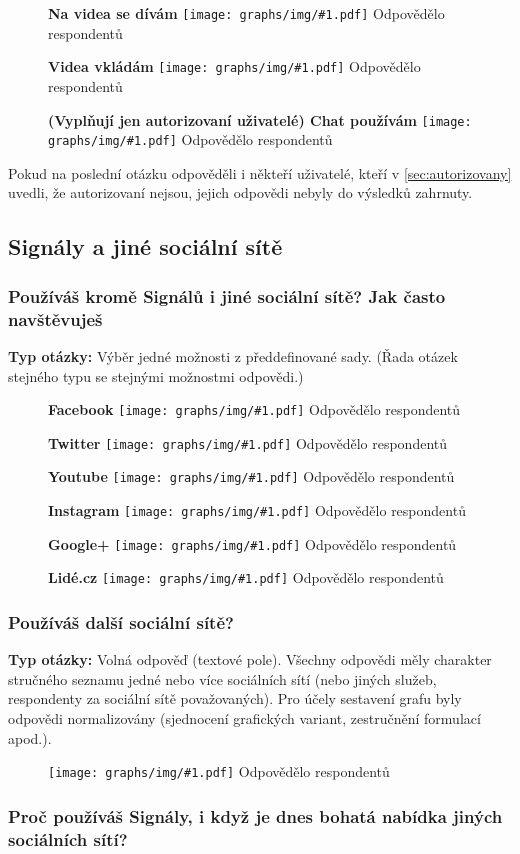\documentclass[12pt, a4paper, twoside]{article}
\newcommand{\answercount}[1]{Odpovědělo  respondentů}
\newcommand{\includegraph}[2]{
  \begin{figure}[H]
    \centering
    \textbf{#2}
    \texttt{[image: graphs/img/\#1.pdf]}
    \answercount{#1}
  \end{figure}
}
\newcommand{\qtype}{\textbf{Typ otázky:}
}
\newcommand{\pickOne}{Výběr jedné možnosti z předdefinované sady\xspace}
\newcommand{\series}{(Řada otázek stejného typu se stejnými možnostmi odpovědi.)\xspace}
\newcommand{\freeEntry}{Volná odpověď (textové pole)}
\begin{document}
\includegraph{funkcionality_videa_prohlizim}{Na videa se dívám}

\includegraph{funkcionality_videa_vkladam}{Videa vkládám}

\includegraph{funkcionality_autorizovani_chat}{(Vyplňují jen autorizovaní uživatelé) Chat používám}

Pokud na poslední otázku odpověděli i někteří uživatelé,
kteří v \ref{sec:autorizovany} uvedli, že autorizovaní nejsou,
jejich odpovědi nebyly do výsledků zahrnuty.

\subsection{Signály a jiné sociální sítě}\label{sec:jinesite}

\subsubsection{Používáš kromě Signálů i jiné sociální sítě? Jak často navštěvuješ}

\qtype \pickOne. \series

\includegraph{jine_site_Facebook}{Facebook}

\includegraph{jine_site_Twitter}{Twitter}

\includegraph{jine_site_Youtube}{Youtube}

\includegraph{jine_site_Instagram}{Instagram}

\includegraph{jine_site_Googleplus}{Google+}

\includegraph{jine_site_Lidecz}{Lidé.cz}

\pagebreak

\subsubsection{Používáš další sociální sítě?}

\qtype \freeEntry.
Všechny odpovědi měly charakter stručného seznamu jedné nebo více
sociálních sítí (nebo jiných služeb, respondenty za sociální sítě
považovaných). Pro účely sestavení grafu byly odpovědi normalizovány
(sjednocení grafických variant, zestručnění formulací apod.).

\includegraph{pouzivas_dalsi_socialni_site}{}

\subsubsection{Proč používáš Signály, i když je dnes bohatá nabídka jiných sociálních sítí?}
\end{document}
